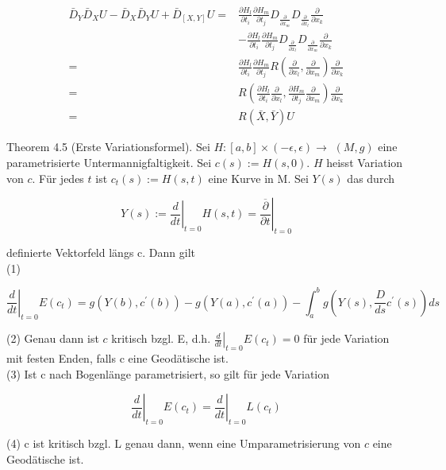 \documentclass[10pt, letterpaper]{article}
\begin{document}
$$
\begin{aligned}
\bar{D}_{Y} \bar{D}_{X} U-\bar{D}_{X} \bar{D}_{Y} U+\bar{D}_{[X, Y]} U= & \frac{\partial H_{l}}{\partial t_{i}} \frac{\partial H_{m}}{\partial t_{j}} D_{\frac{\partial}{\partial x_{m}}} D_{\frac{\partial}{\partial x_{l}}} \frac{\partial}{\partial x_{k}} \\
& -\frac{\partial H_{l}}{\partial t_{i}} \frac{\partial H_{m}}{\partial t_{j}} D_{\frac{\partial}{\partial x_{l}}} D_{\frac{\partial}{\partial x_{m}}} \frac{\partial}{\partial x_{k}} \\
= & \frac{\partial H_{l}}{\partial t_{i}} \frac{\partial H_{m}}{\partial t_{j}} R\left(\frac{\partial}{\partial x_{l}}, \frac{\partial}{\partial x_{m}}\right) \frac{\partial}{\partial x_{k}} \\
= & R\left(\frac{\partial H_{l}}{\partial t_{i}} \frac{\partial}{\partial x_{l}}, \frac{\partial H_{m}}{\partial t_{j}} \frac{\partial}{\partial x_{m}}\right) \frac{\partial}{\partial x_{k}} \\
= & R(\bar{X}, \bar{Y}) U
\end{aligned}
$$

Theorem 4.5 (Erste Variationsformel). Sei $H:[a, b] \times(-\epsilon, \epsilon) \rightarrow$ $(M, g)$ eine parametrisierte Untermannigfaltigkeit. Sei $c(s):=H(s, 0)$. $H$ heisst Variation von $c$. Für jedes $t$ ist $c_{t}(s):=H(s, t)$ eine Kurve in M. Sei $Y(s)$ das durch

$$
Y(s):=\left.\frac{d}{d t}\right|_{t=0} H(s, t)=\left.\overline{\frac{\partial}{\partial t}}\right|_{t=0}
$$

definierte Vektorfeld längs c. Dann gilt\\
(1)

$$
\left.\frac{d}{d t}\right|_{t=0} E\left(c_{t}\right)=g\left(Y(b), c^{\prime}(b)\right)-g\left(Y(a), c^{\prime}(a)\right)-\int_{a}^{b} g\left(Y(s), \frac{D}{d s} c^{\prime}(s)\right) d s
$$

(2) Genau dann ist $c$ kritisch bzgl. E, d.h. $\left.\frac{d}{d t}\right|_{t=0} E\left(c_{t}\right)=0$ für jede Variation mit festen Enden, falls c eine Geodätische ist.\\
(3) Ist c nach Bogenlänge parametrisiert, so gilt für jede Variation

$$
\left.\frac{d}{d t}\right|_{t=0} E\left(c_{t}\right)=\left.\frac{d}{d t}\right|_{t=0} L\left(c_{t}\right)
$$

(4) c ist kritisch bzgl. L genau dann, wenn eine Umparametrisierung von $c$ eine Geodätische ist.
\end{document}
